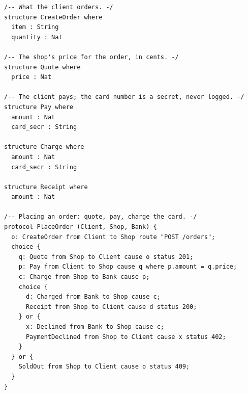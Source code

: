 \begin{lstlisting}[language={},basicstyle=\ttfamily\footnotesize,breaklines=true]
/-- What the client orders. -/
structure CreateOrder where
  item : String
  quantity : Nat

/-- The shop's price for the order, in cents. -/
structure Quote where
  price : Nat

/-- The client pays; the card number is a secret, never logged. -/
structure Pay where
  amount : Nat
  card_secr : String

structure Charge where
  amount : Nat
  card_secr : String

structure Receipt where
  amount : Nat

/-- Placing an order: quote, pay, charge the card. -/
protocol PlaceOrder (Client, Shop, Bank) {
  o: CreateOrder from Client to Shop route "POST /orders";
  choice {
    q: Quote from Shop to Client cause o status 201;
    p: Pay from Client to Shop cause q where p.amount = q.price;
    c: Charge from Shop to Bank cause p;
    choice {
      d: Charged from Bank to Shop cause c;
      Receipt from Shop to Client cause d status 200;
    } or {
      x: Declined from Bank to Shop cause c;
      PaymentDeclined from Shop to Client cause x status 402;
    }
  } or {
    SoldOut from Shop to Client cause o status 409;
  }
}
\end{lstlisting}
